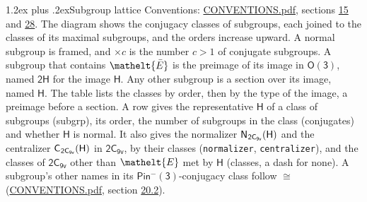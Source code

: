 \documentclass[10pt,a4paper]{article}
\makeatletter
\renewcommand\section{\@startsection{section}{1}{\z@}{-3ex plus -1ex minus -.2ex}%
  {1.2ex plus .2ex}{\normalfont\large\sffamily\bfseries\color{parttitle}}}
\numberwithin{equation}{section}
\newcommand{\eltfont}[1]{{\let\sigma\eltsigma\mathelt{#1}}}
\newcommand{\grp}[1]{\mathsf{#1}}
\newcommand{\cls}[1]{\eltfont{#1}}
\newcommand{\elt}[1]{\eltfont{#1}}
\newcommand{\samecls}{\cong}
\newcommand{\nconj}[1]{{\scriptsize$\times#1$}}
\newcommand{\barred}[1]{\bar{#1}}
\newcommand{\hairsp}{\mkern1mu}
\makeatother
\begin{document}
\section{Subgroup lattice}\label{s:subgroups}
Conventions: \href{../../CONVENTIONS.pdf}{CONVENTIONS.pdf}, sections \href{../../../rotation/CONVENTIONS.pdf\#conv.15}{15} and \href{../../CONVENTIONS.pdf\#conv.28}{28}.
The diagram shows the conjugacy classes of subgroups, each joined to the classes of its maximal subgroups, and the orders increase upward. A normal subgroup is framed, and ${\times}c$ is the number $c > 1$ of conjugate subgroups. \label{n:group.H}A subgroup that contains $\elt{\barred{E}}$ is the preimage of its image in $\grp{O(3)}$, named $\grp{2H}$ for the image $\grp{H}$. Any other subgroup is a section over its image, named $\grp{H}$. The table lists the classes by order, then by the type of the image, a preimage before a section. \label{n:head.subgroup}\label{n:head.order}\label{n:head.conjugates}\label{n:head.normal}A row gives the representative $\grp{H}$ of a class of subgroups (subgrp), its order, the number of subgroups in the class (conjugates) and whether $\grp{H}$ is normal. \label{n:group.normalizer}\label{n:group.centralizer}\label{n:head.classes}It also gives the normalizer $\grp{N}_{\hairsp \grp{2C_{9v}}}(\grp{H})$ and the centralizer $\grp{C}_{\hairsp \grp{2C_{9v}}}(\grp{H})$ in $\grp{2C_{9v}}$, by their classes (\texttt{normalizer}, \texttt{centralizer}), and the classes of $\grp{2C_{9v}}$ other than $\cls{E}$ met by $\grp{H}$ (classes, a dash for none). A subgroup's other names in its \href{Pinminus3.pdf}{$\grp{Pin^{-}(3)}$}-conjugacy class follow $\samecls$ (\href{../../CONVENTIONS.pdf}{CONVENTIONS.pdf}, section \href{../../CONVENTIONS.pdf\#conv.20.2}{20.2}).
\begin{center}
\end{center}
\end{document}
